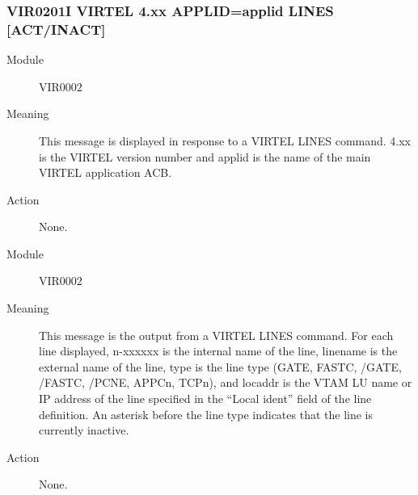 \documentclass[letterpaper,10pt,english]{sphinxmanual}
\begin{document}
\subsubsection{VIR0201I VIRTEL 4.xx APPLID=applid LINES {[}ACT/INACT{]}}
\label{\detokenize{messages:vir0201i-virtel-4-xx-applid-applid-lines-act-inact}}\begin{description}
\item[{Module}] \leavevmode
VIR0002

\item[{Meaning}] \leavevmode
This message is displayed in response to a VIRTEL LINES command. 4.xx is the VIRTEL version number and applid is the name of the main VIRTEL application ACB.

\item[{Action}] \leavevmode
None.

\end{description}
\begin{description}
\item[{Module}] \leavevmode
VIR0002

\item[{Meaning}] \leavevmode
This message is the output from a VIRTEL LINES command. For each line displayed, n-xxxxxx is the internal name of the line, linename is the external name of the line, type is the line type (GATE, FASTC, /GATE, /FASTC, /PCNE, APPCn, TCPn), and locaddr is the VTAM LU name or IP address of the line specified in the “Local ident” field of the line definition. An asterisk before the line type indicates that the line is currently inactive.

\item[{Action}] \leavevmode
None.

\end{description}
\end{document}
